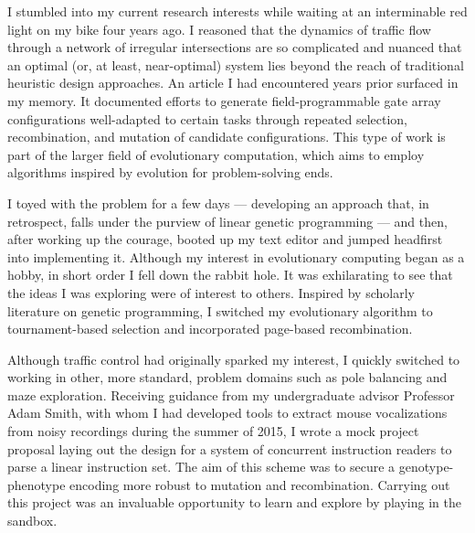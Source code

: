 
I stumbled into my current research interests while waiting at an interminable red light on my bike four years ago.
I reasoned that the dynamics of traffic flow through a network of irregular intersections are so complicated and nuanced that an optimal (or, at least, near-optimal) system lies beyond the reach of traditional heuristic design approaches.
An article I had encountered years prior surfaced in my memory.
It documented efforts to generate field-programmable gate array configurations well-adapted to certain tasks through repeated selection, recombination, and mutation of candidate configurations.
This type of work is part of the larger field of evolutionary computation, which aims to employ algorithms inspired by evolution for problem-solving ends.

I toyed with the problem for a few days --- developing an approach that, in retrospect, falls under the purview of linear genetic programming --- and then, after working up the courage, booted up my text editor and jumped headfirst into implementing it.
Although my interest in evolutionary computing began as a hobby, in short order I fell down the rabbit hole.
It was exhilarating to see that the ideas I was exploring were of interest to others.
Inspired by scholarly literature on genetic programming, I switched my evolutionary algorithm to tournament-based selection and incorporated page-based recombination.

Although traffic control had originally sparked my interest, I quickly switched to working in other, more standard, problem domains such as pole balancing and maze exploration.
Receiving guidance from my undergraduate advisor Professor Adam Smith, with whom I had developed tools to extract mouse vocalizations from noisy recordings during the summer of 2015, I wrote a mock project proposal laying out the design for a system of concurrent instruction readers to parse a linear instruction set.
The aim of this scheme was to secure a genotype-phenotype encoding more robust to mutation and recombination.
Carrying out this project was an invaluable opportunity to learn and explore by playing in the sandbox.

